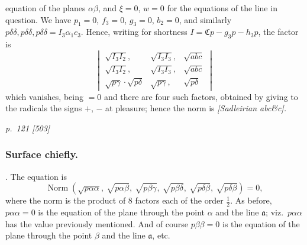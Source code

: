 \documentclass[11pt,a4paper]{book}
\begin{document}
equation of the planes $\alpha\beta$, and $\xi = 0$, $w = 0$ for the equations of
the line in question. We have $p_1 = 0$, $f_3 = 0$, $g_3 = 0$, $b_2 = 0$, and similarly
$p\delta\delta, p\delta\delta, p\delta\delta = I_3 \alpha_1 c_3$. Hence, writing for shortness $I = \mathfrak{C}p - g_3 p - h_3 p$,
the factor is
\[
\begin{vmatrix}
\sqrt{I_3 I_2}, & \sqrt{I_3 I_3}, & \sqrt{abc} \\
\sqrt{I_3 I_2}, & \sqrt{I_3 I_3}, & \sqrt{abc} \\
\sqrt{p\gamma}\cdot\sqrt{p\delta} & \sqrt{p\gamma}, & \sqrt{p\delta}
\end{vmatrix}
\]
which vanishes, being $= 0$ and there are four such factors, obtained by
giving to the radicals the signs $+$, $-$ at pleasure; hence the norm is
\textit{[Sadleirian abc\&c].}

\clearpage

\bigskip
\textit{p.~121 [503]}
\smallskip

\subsubsection*{Surface chiefly.}

. The equation is
\[
\operatorname{Norm}\left(\sqrt{p\alpha\alpha},\ \sqrt{p\alpha\beta},\ \sqrt{p\beta\gamma},\ \sqrt{p\beta\delta},\ \sqrt{p\delta\beta},\ \sqrt{p\delta\beta}\right) = 0,
\]
where the norm is the product of 8 factors each of the order $\tfrac{1}{2}$. As before, $p\alpha\alpha = 0$
is the equation of the plane through the point $\alpha$ and the line $\mathfrak{a}$; viz.\ $p\alpha\alpha$ has the
value previously mentioned. And of course $p\beta\beta = 0$ is the equation of the plane through
the point $\beta$ and the line $\mathfrak{a}$, etc.
\end{document}
